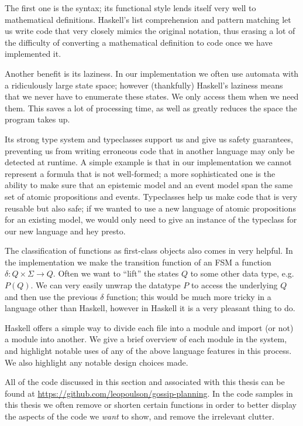 \documentclass[10pt, a4paper]{report}
\begin{document}
The first one is the syntax; its functional style lends itself very well to
mathematical definitions. Haskell's list comprehension and pattern matching let us
write code that very closely mimics the original notation, thus erasing a lot of
the difficulty of converting a mathematical definition to code once we have
implemented it. 

Another benefit is its laziness. In our implementation we often use automata
with a ridiculously large state space; however (thankfully) Haskell's laziness
means that we never have to enumerate these states. We only access them when we
need them. This saves a lot of processing time, as well as greatly reduces the
space the program takes up.

Its strong type system and typeclasses support us and give us safety guarantees,
preventing us from writing erroneous code that in another language may only be
detected at runtime. A simple example is that in our implementation we cannot
represent a formula that is not well-formed; a more sophisticated one is the
ability to make sure that an epistemic model and an event model span the same
set of atomic propositions and events. Typeclasses help us make code that is
very reusable but also safe; if we wanted to use a new language of atomic
propositions for an existing model, we would only need to give an instance of
the  typeclass for our new language and hey presto.

The classification of functions as first-class objects also comes in very
helpful. In the implementation we make the transition function of an FSM a
function $\delta : Q \times \Sigma \rightarrow Q$. Often we want to ``lift'' the
states $Q$ to some other data type, e.g. $P (Q)$. We can very easily unwrap the
datatype $P$ to access the underlying $Q$ and then use the previous $\delta$
function; this would be much more tricky in a language other than Haskell,
however in Haskell it is a very pleasant thing to do.

Haskell offers a simple way to divide each file into a module and import (or
not) a module into another. We give a brief overview of each module in the
system, and highlight notable uses of any of the above language features in this
process. We also highlight any notable design choices made.

All of the code discussed in this section and associated with this thesis can be
found at \url{https://github.com/leopoulson/gossip-planning}. In the code
samples in this thesis we often remove or shorten certain functions in order to
better display the aspects of the code we \emph{want} to show, and remove the
irrelevant clutter. 
\end{document}
